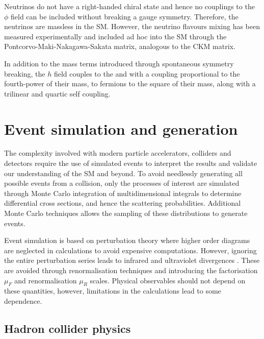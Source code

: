 Neutrinos do not have a right-handed chiral state and hence no couplings to
the $\phi$ field can be included without breaking a gauge symmetry. Therefore,
the neutrinos are massless in the SM. However, the neutrino flavours mixing
has been measured experimentally and included ad hoc into the SM through the
Pontcorvo-Maki-Nakagawa-Sakata matrix\cite{Pontecorvo:1957qd,Maki:1962mu},
analogous to the CKM matrix.

In addition to the mass terms introduced through spontaneous symmetry breaking, the $h$ field couples to the \PW and \PZ with a coupling proportional to the fourth-power of their mass, to fermions to the square of their mass, along with a trilinear and quartic self coupling.


\section{Event simulation and generation}

The complexity involved with modern particle accelerators, colliders and detectors require the use of simulated events to interpret the results and validate our understanding of the SM and beyond. To avoid needlessly generating all possible events from a collision, only the processes of interest are simulated through Monte Carlo integration of multidimensional integrals to determine differential cross sections, and hence the scattering probabilities. Additional Monte Carlo techniques allows the sampling of these distributions to generate events.

Event simulation is based on perturbation theory where higher order diagrams are neglected in calculations to avoid expensive computations. However, ignoring the entire perturbation series leads to infrared and ultraviolet divergences \cite{Ellis:1991qj}. These are avoided through renormalisation techniques and introducing the factorisation $\mu_F$ and renormalisation $\mu_R$ scales. Physical observables should not depend on these quantities, however, limitations in the calculations lead to some dependence.


\subsection{Hadron collider physics}\label{sec:hadron-collider-physics}

